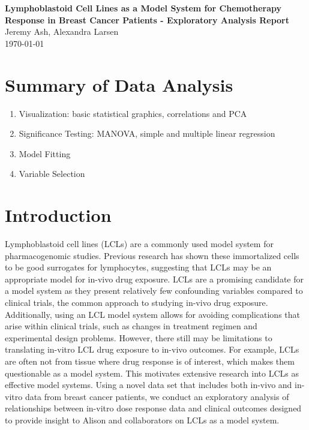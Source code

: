\documentclass[12pt]{article}
\begin{document}
\linenumbers

\graphicspath{ {Figures/} }

\begin{center}
{\Large {\bf Lymphoblastoid Cell Lines as a Model System for Chemotherapy Response in Breast Cancer Patients - Exploratory Analysis Report}}\\
\large{Jeremy Ash, Alexandra Larsen} \\
\today
\end{center}

\section*{Summary of Data Analysis}\label{s:intro}

\begin{enumerate}
	\item Visualization: basic statistical graphics, correlations and PCA
	\item Significance Testing:  MANOVA, simple and multiple linear regression
	\item Model Fitting
	\item Variable Selection
\end{enumerate}

\section*{Introduction}

Lymphoblastoid cell lines (LCLs) are a commonly used model system for pharmacogenomic studies. Previous research has shown these immortalized cells to be good surrogates for lymphocytes, suggesting that LCLs may be an appropriate model for in-vivo drug exposure. LCLs are a promising candidate for a model system as they present relatively few confounding variables compared to clinical trials, the common approach to studying in-vivo drug exposure. Additionally, using an LCL model system allows for avoiding complications that arise within clinical trials, such as changes in treatment regimen and experimental design problems. However, there still may be limitations to translating in-vitro LCL drug exposure to in-vivo outcomes.  For example, LCLs are often not from tissue where drug response is of interest, which makes them questionable as a model system. This motivates extensive research into LCLs as effective model systems. Using a novel data set that includes both in-vivo and in-vitro data from breast cancer patients, we conduct an exploratory analysis of relationships between in-vitro dose response data and clinical outcomes designed to provide insight to Alison and collaborators on LCLs as a model system. 
\end{document}
